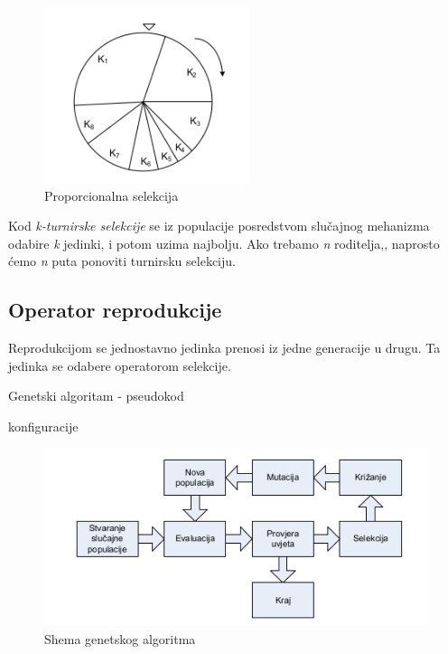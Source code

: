 \documentclass[times, utf8, zavrsni, numeric]{fer}
\begin{document}
\begin{figure}[htb]
\centering
\includegraphics[width=6cm]{img/selekcija.png}
\caption{Proporcionalna selekcija}
\label{fig:selekcija}
\end{figure}

Kod \emph{k-turnirske selekcije} se iz populacije posredstvom slučajnog mehanizma odabire \emph{k} jedinki, i potom uzima najbolju. Ako trebamo \emph{n} roditelja,, naprosto ćemo \emph{n} puta ponoviti turnirsku selekciju.

\subsection{Operator reprodukcije}
Reprodukcijom se jednostavno jedinka prenosi iz jedne generacije u drugu. Ta jedinka se odabere operatorom selekcije.

\begin{algorithm}
\caption{Genetski algoritam - pseudokod}
\label{alg:genetski}
\begin{algorithmic}
\REPEAT
{}
konfiguracije
\ENDWHILE
{}
\end{algorithmic}
\end{algorithm}

\begin{figure}[htb]
\centering
\includegraphics[width=12cm]{img/genetski_shema.png}
\caption{Shema genetskog algoritma}
\label{fig:genetski_shema}
\end{figure}
\end{document}
